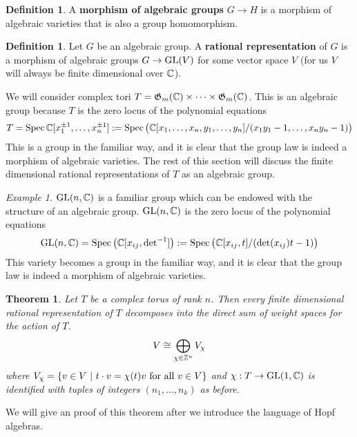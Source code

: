 \documentclass{amsart}
\numberwithin{equation}{section}
\theoremstyle{plain} %
\newtheorem{theorem}[equation]{Theorem}
\theoremstyle{definition}
\newtheorem{definition}[equation]{Definition}
\theoremstyle{remark}
\newtheorem{example}[equation]{Example}
\begin{document}
\begin{definition}
    A \textbf{morphism of algebraic groups} $G\to H$ is a morphism of algebraic varieties that is also a group homomorphism.
\end{definition}

\begin{definition}
    Let $G$ be an algebraic group. A \textbf{rational representation} of $G$ is a morphism of algebraic groups
    $G\to \operatorname{GL}(V)$ for some vector space $V$ (for us $V$ will always be finite dimensional over $\mathbb{C}$). 
\end{definition}

We will consider complex tori $T = \mathfrak{G}_m(\mathbb{C})\times\cdots\times\mathfrak{G}_m(\mathbb{C})$.
This is an algebraic group because $T$ is the zero locus of 
the polynomial equations \begin{align*}
    T = \operatorname{Spec} \mathbb{C}[x_1^{\pm 1},\ldots, x_n^{\pm 1}] := \operatorname{Spec}\big(\mathbb{C}[x_1,\dots,x_n,y_1,\dots,y_n]/(x_1y_1-1,\dots,x_ny_n-1)\big)
\end{align*} This is a group in the familiar way, 
and it is clear that the group law is indeed a morphism of algebraic varieties. The rest of this section will discuss 
the finite dimensional rational representations of $T$ as an algebraic group.

\begin{example}
    $\operatorname{GL}(n,\mathbb{C})$ is a familiar group which can be endowed with the structure of an algebraic group.
    $\operatorname{GL}(n,\mathbb{C})$ is the zero locus of the polynomial equations
    \begin{align*}
        \operatorname{GL}(n,\mathbb{C}) = \operatorname{Spec} \big(\mathbb{C}[x_{ij},{\det}^{-1}]\big) := \operatorname{Spec}\big(\mathbb{C}[x_{ij},t]/(\det(x_{ij})t-1)\big)
    \end{align*} This variety becomes a group in the familiar way,
    and it is clear that the group law is indeed a morphism of algebraic varieties.
\end{example}




\begin{theorem}\label{thm:ratrep}
    Let $T$ be a complex torus of rank $n$.
    Then every finite dimensional rational representation of $T$ 
    decomposes into the direct sum of weight spaces for the action of $T$.
    \begin{align*}
        V \cong \bigoplus_{\chi\in \mathbb{Z}^n} V_\chi
    \end{align*} where $V_\chi = \{v\in V \ \vert \  t\cdot v = \chi(t)v \text{ for all $v\in V$}\}$
    and $\chi:T\to\operatorname{GL}(1,\mathbb{C})$ is identified with tuples of integers $(n_1,\ldots, n_k)$ as before.
\end{theorem}
We will give an proof of this theorem after we introduce the language of Hopf algebras.
\end{document}
